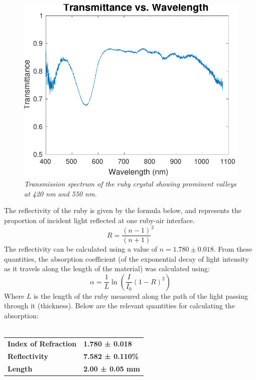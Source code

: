 \documentclass[11pt, a4paper, twocolumn]{article}
\begin{document}
\begin{figure}[H]
\includegraphics[width=\linewidth]{transmissionSpectrum.pdf}
\caption{\textit{Transmission spectrum of the ruby crystal showing prominent valleys at 420 nm and 550 nm.}}
\label{fig:intensities}
\end{figure}
The reflectivity of the ruby is given by the formula below, and represents the proportion of incident light reflected at one ruby-air interface.
$$R=\frac{(n-1)}{(n+1)}^2$$
The reflectivity can be calculated using a value of $n = 1.780 \pm 0.018$. From these quantities, the absorption coefficient (of the exponential decay of light intensity as it travels along the length of the material) was calculated using:
$$ \alpha = \frac{1}{L}\ln(\frac{I}{I_0}(1-R)^2)$$
Where $L$ is the length of the ruby measured along the path of the light passing through it (thickness). Below are the relevant quantities for calculating the absorption:
\\\\
\begin{tabular}{ll}
\textbf{Index of Refraction} & \textbf{1.780 ± 0.018}    \\
\textbf{Reflectivity}        & \textbf{7.582 ± 0.110\%}  \\
\textbf{Length}              & \textbf{2.00 ± 0.05 mm}  
\end{tabular}
\end{document}
